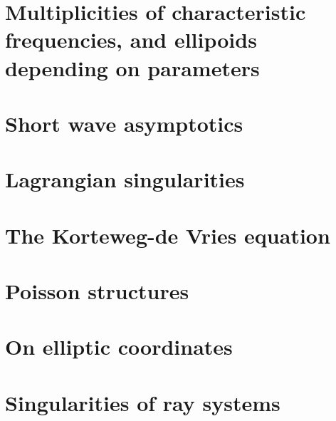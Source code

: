 \documentclass{book}
\numberwithin{equation}{section}
\theoremstyle{plain}
\theoremstyle{definition}
\theoremstyle{remark}
\theoremstyle{remark}
\begin{document}
\chapter{Multiplicities of characteristic frequencies, and ellipoids
depending on parameters}

\chapter{Short wave asymptotics}

\chapter{Lagrangian singularities}

\chapter{The Korteweg-de Vries equation}

\chapter{Poisson structures}

\chapter{On elliptic coordinates}

\chapter{Singularities of ray systems}
\end{document}
